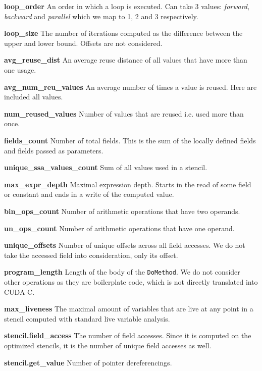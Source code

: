 \documentclass[sigplan,\review anonymous]{acmart}
\begin{document}
\begin{description}
  \item \textbf{loop\_order} An order in which a loop is executed. Can take 3
  values: \textit{forward}, \textit{backward} and \textit{parallel} which we
  map to 1, 2 and 3 respectively.
  \item \textbf{loop\_size} The number of iterations computed as the difference
  between the upper and lower bound. Offsets are not considered.
  \item \textbf{avg\_reuse\_dist} An average reuse distance of all values that
  have more than one usage.
  \item \textbf{avg\_num\_reu\_values} An average number of times a value is
  reused. Here are included all values.
  \item \textbf{num\_reused\_values} Number of values that are reused i.e. used
  more than once.
  \item \textbf{fields\_count} Number of total fields. This is the sum of the
  locally defined fields and fields passed as parameters.
  \item \textbf{unique\_ssa\_values\_count} Sum of all values used in a stencil.
  \item \textbf{max\_expr\_depth} Maximal expression depth. Starts in the read
  of some field or constant and ends in a write of the computed value.
  \item \textbf{bin\_ops\_count} Number of arithmetic operations that have two
  operands.
  \item \textbf{un\_ops\_count} Number of arithmetic operations that have one
  operand.
  \item \textbf{unique\_offsets} Number of unique offsets across all field
  accesses. We do not take the accessed field into consideration, only its 
  offset.
  \item \textbf{program\_length} Length of the body of the \texttt{DoMethod}.
  We do not consider other operations as they are boilerplate code, which is
  not directly translated into CUDA C.
  \item \textbf{max\_liveness} The maximal amount of variables that are live
  at any point in a stencil computed with standard live variable analysis.
  \item \textbf{stencil.field\_access} The number of field accesses. Since
  it is computed on the optimized stencils, it is the number of unique field
  accesses as well.
  \item \textbf{stencil.get\_value} Number of pointer dereferencings.

\end{description}
\end{document}
